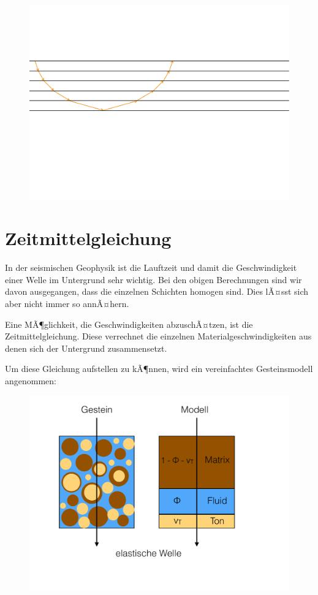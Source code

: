 \begin{figure}[H]
	\centering
	\includegraphics[width = \textwidth]{SeismikBilder/Tauchwelle}
\end{figure}


\section{Zeitmittelgleichung}
In der seismischen Geophysik ist die Lauftzeit und damit die Geschwindigkeit einer Welle im Untergrund sehr wichtig. Bei den obigen Berechnungen sind wir davon ausgegangen, dass die einzelnen Schichten homogen sind. Dies lÃ¤sst sich aber nicht immer so annÃ¤hern. 

Eine MÃ¶glichkeit, die Geschwindigkeiten abzuschÃ¤tzen, ist die Zeitmittelgleichung. Diese verrechnet die einzelnen Materialgeschwindigkeiten aus denen sich der Untergrund zusammensetzt. 

Um diese Gleichung aufstellen zu kÃ¶nnen, wird ein vereinfachtes Gesteinsmodell angenommen: 

\begin{figure}[H]
	\centering
	\includegraphics[width = \textwidth]{SeismikBilder/Zeitmittelgleichung}
\end{figure}

